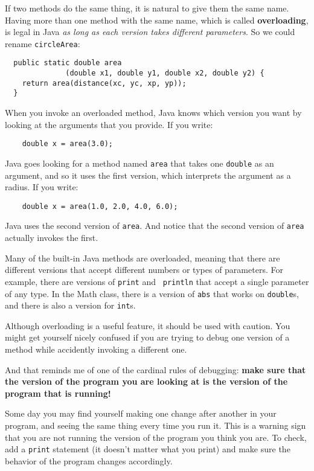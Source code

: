 \documentclass{book}
\begin{document}
If two methods do the same thing, it is natural to give them
the same name.  
Having more than one method with the same name, which is called {\bf
overloading}, is legal in Java {\em as long as each version takes
different parameters}.  So we could rename {\tt circleArea}:

\begin{verbatim}
  public static double area
              (double x1, double y1, double x2, double y2) {
    return area(distance(xc, yc, xp, yp));
  } 
\end{verbatim}
%
When you invoke an overloaded method, Java knows which version you
want by looking at the arguments that you provide.  If you write:

\begin{verbatim}
    double x = area(3.0);
\end{verbatim}
%
Java goes looking for a method named {\tt area} that
takes one {\tt double} as an argument, and so it uses the
first version, which interprets the argument as a radius.
If you write:

\begin{verbatim}
    double x = area(1.0, 2.0, 4.0, 6.0);
\end{verbatim}
%
Java uses the second version of {\tt area}.  And notice that the
second version of {\tt area} actually invokes the first.

Many of the built-in Java methods are overloaded, meaning that there
are different versions that accept different numbers or types of
parameters.  For example, there are versions of {\tt print} and {\tt
println} that accept a single parameter of any type.  In the Math
class, there is a version of {\tt abs} that works on {\tt double}s,
and there is also a version for {\tt int}s.

Although overloading is a useful feature, it should be used
with caution.  You might get yourself nicely confused if you
are trying to debug one version of a method while accidently
invoking a different one.

And that reminds me of one of the cardinal rules of
debugging: {\bf make sure that the version of the program
you are looking at is the version of the program that is running!}

Some day you may find yourself making one change after another
in your program, and seeing the same thing every time you run it.
This is a warning sign that you are
not running the version of the program you think you are.  To
check, add a {\tt print} statement (it doesn't matter what
you print) and make sure the behavior of the program changes
accordingly.
\end{document}
